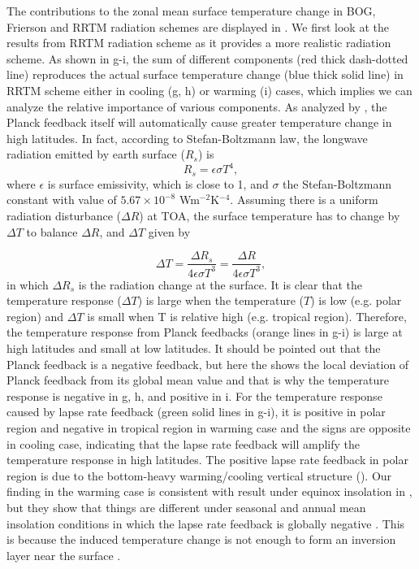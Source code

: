 The contributions to the zonal mean surface temperature change in BOG, Frierson and RRTM radiation schemes are displayed in . We first look at the results from RRTM radiation scheme as it provides a more realistic radiation scheme. As shown in g-i, the sum of different components (red thick dash-dotted line) reproduces the actual surface temperature change (blue thick solid line) in RRTM scheme either in cooling (g, h) or warming (i) cases, which implies we can analyze the relative importance of various components. As analyzed by \cite{Pithan2014}, the Planck feedback itself will automatically cause greater temperature change in high latitudes. In fact, according to Stefan-Boltzmann law, the longwave radiation emitted by earth surface ($R_s$) is
\begin{equation}
	R_s = \epsilon\sigma T^4,
\end{equation}
where $\epsilon$ is surface emissivity, which is close to 1, and $\sigma$ the Stefan-Boltzmann constant with value of $5.67\times 10^{-8}$ Wm$^{-2}$K$^{-4}$. Assuming there is a uniform radiation disturbance ($\Delta R$) at TOA, the surface temperature has to change by $\Delta T$ to balance $\Delta R$, and $\Delta T$ given by

\begin{equation}
\Delta T =\frac{\Delta R_s}{4\epsilon\sigma T^3}=\frac{\Delta R}{4\epsilon\sigma T^3},
\end{equation}
in which $\Delta R_s$ is the radiation change at the surface. It is clear that the temperature response ($\Delta T$) is large when the temperature ($T$) is low (e.g. polar region) and $\Delta T$ is small when T is relative high (e.g. tropical region). Therefore, the temperature response from Planck feedbacks (orange lines in g-i) is large at high latitudes and small at low latitudes. It should be pointed out that the Planck feedback is a negative feedback, but here the  shows the local deviation of Planck feedback from its global mean value and that is why the temperature response is negative in g, h, and positive in i. For the temperature response caused by lapse rate feedback (green solid lines in g-i), it is positive in polar region and negative in tropical region in warming case and the signs are opposite in cooling case, indicating that the lapse rate feedback will amplify the temperature response in high latitudes. The positive lapse rate feedback in polar region is due to the bottom-heavy warming/cooling vertical structure (). Our finding in the warming case is consistent with result under equinox insolation in \cite{Kim2018}, but they show that things are different under seasonal and annual mean insolation conditions in which the lapse rate feedback is globally negative \citep[see Fig. S1 of][]{Kim2018}. This is because the induced temperature change is not enough to form an inversion layer near the surface \citep{Kim2018}. %

